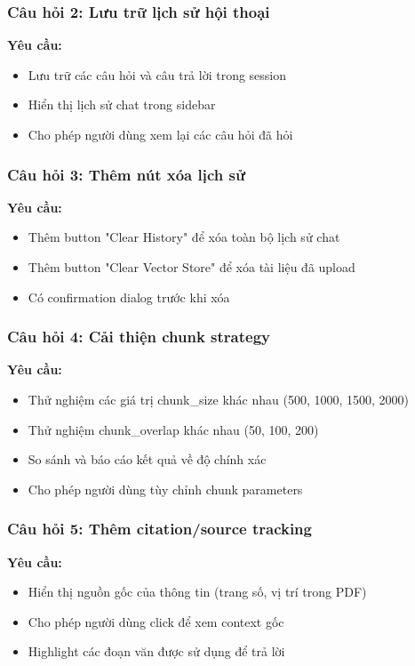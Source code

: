 \documentclass[a4paper]{article}
\begin{document}
\subsubsection{Câu hỏi 2: Lưu trữ lịch sử hội thoại} 
\textbf{Yêu cầu:}
\begin{itemize}
    \item Lưu trữ các câu hỏi và câu trả lời trong session
    \item Hiển thị lịch sử chat trong sidebar
    \item Cho phép người dùng xem lại các câu hỏi đã hỏi
\end{itemize}
\subsubsection{Câu hỏi 3: Thêm nút xóa lịch sử}
\textbf{Yêu cầu:}
\begin{itemize}
    \item Thêm button "Clear History" để xóa toàn bộ lịch sử chat
    \item Thêm button "Clear Vector Store" để xóa tài liệu đã upload
    \item Có confirmation dialog trước khi xóa
\end{itemize}
\subsubsection{Câu hỏi 4: Cải thiện chunk strategy} 
\textbf{Yêu cầu:}
\begin{itemize}
    \item Thử nghiệm các giá trị chunk\_size khác nhau (500, 1000, 1500, 2000)
    \item Thử nghiệm chunk\_overlap khác nhau (50, 100, 200)
    \item So sánh và báo cáo kết quả về độ chính xác
    \item Cho phép người dùng tùy chỉnh chunk parameters
\end{itemize}
\subsubsection{Câu hỏi 5: Thêm citation/source tracking}
\textbf{Yêu cầu:}
\begin{itemize}
    \item Hiển thị nguồn gốc của thông tin (trang số, vị trí trong PDF)
    \item Cho phép người dùng click để xem context gốc
    \item Highlight các đoạn văn được sử dụng để trả lời
\end{itemize}
\end{document}
